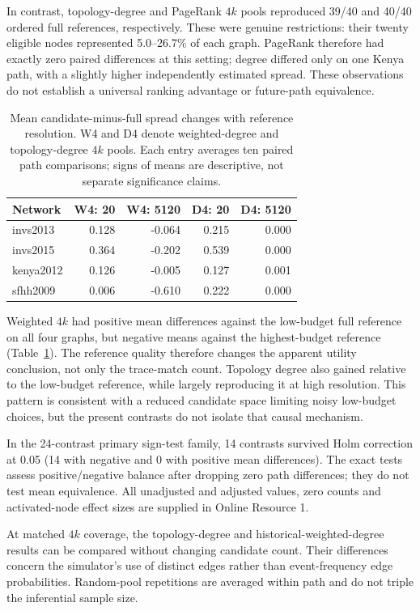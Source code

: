 In contrast, topology-degree and PageRank $4k$ pools reproduced 39/40 and 40/40 ordered full references, respectively. These were genuine restrictions: their twenty eligible nodes represented 5.0--26.7\% of each graph. PageRank therefore had exactly zero paired differences at this setting; degree differed only on one Kenya path, with a slightly higher independently estimated spread. These observations do not establish a universal ranking advantage or future-path equivalence.


\begin{table}[t]
\caption{Mean candidate-minus-full spread changes with reference resolution. W4 and D4 denote weighted-degree and topology-degree $4k$ pools. Each entry averages ten paired path comparisons; signs of means are descriptive, not separate significance claims.}\label{tab:budget-effects}
\centering
\begin{tabular}{lrrrr}
\toprule
Network & W4: 20 & W4: 5120 & D4: 20 & D4: 5120 \\
\midrule
invs2013 & 0.128 & -0.064 & 0.215 & 0.000 \\
invs2015 & 0.364 & -0.202 & 0.539 & 0.000 \\
kenya2012 & 0.126 & -0.005 & 0.127 & 0.001 \\
sfhh2009 & 0.006 & -0.610 & 0.222 & 0.000 \\
\bottomrule
\end{tabular}
\end{table}
Weighted $4k$ had positive mean differences against the low-budget full reference on all four graphs, but negative means against the highest-budget reference (Table~\ref{tab:budget-effects}). The reference quality therefore changes the apparent utility conclusion, not only the trace-match count. Topology degree also gained relative to the low-budget reference, while largely reproducing it at high resolution. This pattern is consistent with a reduced candidate space limiting noisy low-budget choices, but the present contrasts do not isolate that causal mechanism.

In the 24-contrast primary sign-test family, 14 contrasts survived Holm correction at 0.05 (14 with negative and 0 with positive mean differences). The exact tests assess positive/negative balance after dropping zero path differences; they do not test mean equivalence. All unadjusted and adjusted values, zero counts and activated-node effect sizes are supplied in Online Resource 1.

At matched $4k$ coverage, the topology-degree and historical-weighted-degree results can be compared without changing candidate count. Their differences concern the simulator's use of distinct edges rather than event-frequency edge probabilities. Random-pool repetitions are averaged within path and do not triple the inferential sample size.


